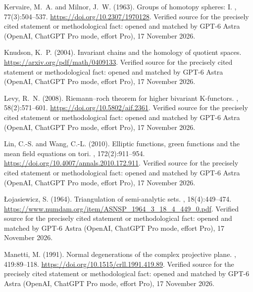 \begin{thebibliography}{}
Kervaire, M.~A. and Milnor, J.~W. (1963).
\newblock Groups of homotopy spheres: I.
, 77(3):504--537.
\newblock \url{https://doi.org/10.2307/1970128}. Verified source for the precisely cited statement or methodological fact: opened and matched by GPT-6 Astra (OpenAI, ChatGPT Pro mode, effort Pro), 17 November 2026.

Knudson, K.~P. (2004).
\newblock Invariant chains and the homology of quotient spaces.
\newblock \url{https://arxiv.org/pdf/math/0409133}. Verified source for the precisely cited statement or methodological fact: opened and matched by GPT-6 Astra (OpenAI, ChatGPT Pro mode, effort Pro), 17 November 2026.

Levy, R.~N. (2008).
\newblock Riemann--roch theorem for higher bivariant {K}-functors.
, 58(2):571--601.
\newblock \url{https://doi.org/10.5802/aif.2361}. Verified source for the precisely cited statement or methodological fact: opened and matched by GPT-6 Astra (OpenAI, ChatGPT Pro mode, effort Pro), 17 November 2026.

Lin, C.-S. and Wang, C.-L. (2010).
\newblock Elliptic functions, green functions and the mean field equations on
  tori.
, 172(2):911--954.
\newblock \url{https://doi.org/10.4007/annals.2010.172.911}. Verified source for the precisely cited statement or methodological fact: opened and matched by GPT-6 Astra (OpenAI, ChatGPT Pro mode, effort Pro), 17 November 2026.

\L{}ojasiewicz, S. (1964).
\newblock Triangulation of semi-analytic sets.
, 18(4):449--474.
\newblock \url{https://www.numdam.org/item/ASNSP_1964_3_18_4_449_0.pdf}. Verified source for the precisely cited statement or methodological fact: opened and matched by GPT-6 Astra (OpenAI, ChatGPT Pro mode, effort Pro), 17 November 2026.

Manetti, M. (1991).
\newblock Normal degenerations of the complex projective plane.
,
  419:89--118.
\newblock \url{https://doi.org/10.1515/crll.1991.419.89}. Verified source for the precisely cited statement or methodological fact: opened and matched by GPT-6 Astra (OpenAI, ChatGPT Pro mode, effort Pro), 17 November 2026.


\end{thebibliography}
